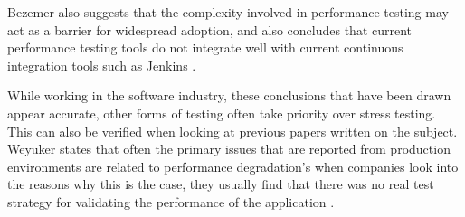 Bezemer also suggests that the complexity involved in performance testing may act as a barrier for widespread adoption, and also concludes that current performance testing tools do not integrate well with current continuous integration tools such as Jenkins \cite{jenkinsCi}.

While working in the software industry, these conclusions that have been drawn appear accurate, other forms of testing often take priority over stress testing. This can also be verified when looking at previous papers written on the subject. Weyuker states that often the primary issues that are reported from production environments are related to performance degradation's when companies look into the reasons why this is the case, they usually find that there was no real test strategy for validating the performance of the application \cite{888628}.